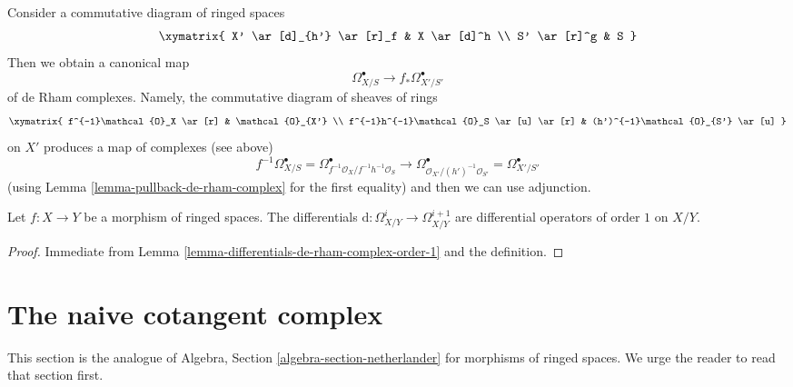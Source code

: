 \noindent
Consider a commutative diagram of ringed spaces
$$
\xymatrix{
X' \ar[d]_{h'} \ar[r]_f & X \ar[d]^h \\
S' \ar[r]^g & S
}
$$
Then we obtain a canonical map
$$
\Omega^\bullet_{X/S} \to f_*\Omega^\bullet_{X'/S'}
$$
of de Rham complexes. Namely, the commutative diagram
of sheaves of rings
$$
\xymatrix{
f^{-1}\mathcal{O}_X \ar[r] & \mathcal{O}_{X'} \\
f^{-1}h^{-1}\mathcal{O}_S \ar[u] \ar[r] & (h')^{-1}\mathcal{O}_{S'} \ar[u]
}
$$
on $X'$ produces a map of complexes (see above)
$$
f^{-1}\Omega^\bullet_{X/S} =
\Omega^\bullet_{f^{-1}\mathcal{O}_X/f^{-1}h^{-1}\mathcal{O}_S}
\longrightarrow
\Omega^\bullet_{\mathcal{O}_{X'}/(h')^{-1}\mathcal{O}_{S'}} =
\Omega^\bullet_{X'/S'}
$$
(using Lemma \ref{lemma-pullback-de-rham-complex} for the first equality)
and then we can use adjunction.

\begin{lemma}
\label{lemma-differentials-relative-de-rham-complex-order-1}
Let $f : X \to Y$ be a morphism of ringed spaces. The differentials
$\text{d} : \Omega^i_{X/Y}  \to \Omega^{i + 1}_{X/Y}$
are differential operators of order $1$ on $X/Y$.
\end{lemma}

\begin{proof}
Immediate from Lemma \ref{lemma-differentials-de-rham-complex-order-1}
and the definition.
\end{proof}





















\section{The naive cotangent complex}
\label{section-netherlander}

\noindent
This section is the analogue of
Algebra, Section \ref{algebra-section-netherlander} for morphisms of ringed
spaces. We urge the reader to read that section first.


